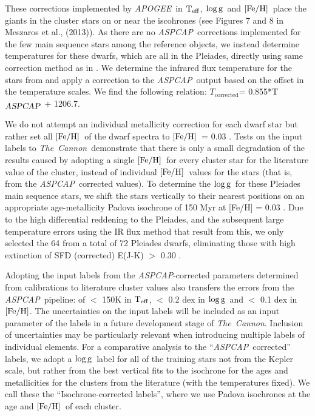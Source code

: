 \documentclass[12pt, preprint]{aastex}
\newcommand{\teff}{\mbox{$\rm T_{eff}$}}
\newcommand{\feh}{\mbox{$\rm [Fe/H]$}}
\newcommand{\logg}{\mbox{$\rm \log g$}}
\newcommand{\tc}{\textsl{The~Cannon}}
\newcommand{\apogee}{\textsl{APOGEE}}
\newcommand{\aspcap}{\textsl{ASPCAP}}
\begin{document}
These corrections implemented by \apogee\ in \teff, \logg\ and  \feh\ place the giants in the cluster stars on or near the iscohrones (see Figures 7 and 8 in Meszaros et al., (2013)).  
As there are no \aspcap\ corrections implemented for the few main sequence stars among the reference objects, 
we instead determine temperatures for these dwarfs, which are all in the Pleiades, directly using same correction method 
as in \citet{Meszaros2013}. 
We determine the infrared flux temperature for the stars from \citet{gonzalez2009} and apply a correction to 
the \aspcap\ output based on the offset in the temperature scales. We find the following relation:
 $T_{\mbox{corrected}}$= 0.855*T$_{\mbox{\textit{\aspcap}}}$ + 1206.7.


We do not attempt an individual metallicity correction for each dwarf star but rather set all \feh\ of the dwarf spectra to \feh\ = 0.03 \citep{barrado2001}.
Tests on the input labels to \tc\ demonstrate that there is only a small degradation of the results caused by adopting a single \feh\ for every cluster star for the literature value of the cluster, instead of individual \feh\ values for the stars (that is, from the \aspcap\ corrected values). 
To determine the \logg\ for these Pleiades main sequence stars, we shift the stars vertically to their nearest positions on an appropriate age-metallicity Padova isochrone of 150 Myr at [Fe/H] = 0.03 \citep{girardi2000}. 
Due to the high differential reddening to the Pleiades, and the subsequent large temperature errors using the IR flux method that result from this, we only selected the 64 from a total of 72 Pleiades dwarfs, eliminating those with high extinction of SFD (corrected) E(J-K) $>$ 0.30 \citep{Schlafly2011}.

Adopting the input labels from the \aspcap-corrected parameters determined from calibrations to literature cluster values also transfers the errors from the \aspcap\ pipeline: of $<$ 150K in \teff,  $<$ 0.2 dex in \logg\ and $<$ 0.1 dex in \feh.   
The uncertainties on the input labels will be included as an input parameter of the labels in a future development stage of \tc. Inclusion of uncertainties may be particularly relevant when introducing multiple labels of individual elements. 
For a comparative analysis to the ``\aspcap\ corrected'' labels, we adopt a \logg\ label for all of the training stars not from the Kepler scale, but rather from the best vertical fits to the isochrone for the ages and metallicities for the clusters from the literature (with the temperatures fixed). 
We call these the ``Isochrone-corrected labels'', where we use Padova isochrones at the age and \feh\ of each cluster. 
\end{document}
